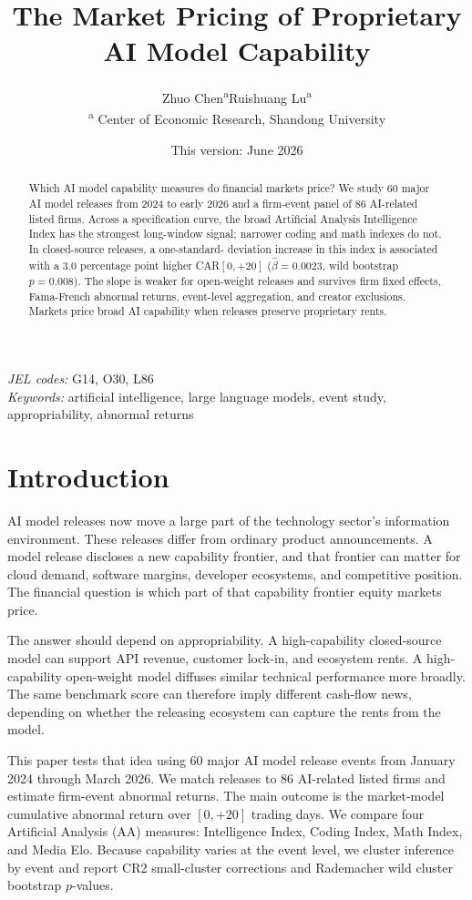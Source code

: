 \documentclass[12pt]{article}
\title{\textbf{The Market Pricing of Proprietary AI Model Capability}}
\author{\begin{tabular}{c}
Zhuo Chen\textsuperscript{a}\quad Ruishuang Lu\textsuperscript{a}\\[0.5em]
{\footnotesize \textsuperscript{a} Center of Economic Research, Shandong University}
\end{tabular}}
\date{\small This version: June 2026}
\begin{document}
\maketitle
\thispagestyle{empty}

\begin{abstract}
\noindent
Which AI model capability measures do financial markets price? We study 60 major
AI model releases from 2024 to early 2026 and a firm-event panel of 86
AI-related listed firms. Across a specification curve, the broad Artificial
Analysis Intelligence Index has the strongest long-window signal; narrower
coding and math indexes do not. In closed-source releases, a one-standard-
deviation increase in this index is associated with a 3.0 percentage point
higher CAR$[0,{+}20]$ ($\hat{\beta}=0.0023$, wild bootstrap $p=0.008$). The
slope is weaker for open-weight releases and survives firm fixed effects,
Fama-French abnormal returns, event-level aggregation, and creator exclusions.
Markets price broad AI capability when releases preserve proprietary rents.
\end{abstract}

\medskip
\noindent\textit{JEL codes:} G14, O30, L86\\
\noindent\textit{Keywords:} artificial intelligence, large language models, event study, appropriability, abnormal returns

\newpage

\section{Introduction}
\label{sec:intro}

AI model releases now move a large part of the technology sector's information
environment. These releases differ from ordinary product announcements. A model
release discloses a new capability frontier, and that frontier can matter for
cloud demand, software margins, developer ecosystems, and competitive position.
The financial question is which part of that capability frontier equity markets
price.

The answer should depend on appropriability. A high-capability closed-source
model can support API revenue, customer lock-in, and ecosystem rents. A high-
capability open-weight model diffuses similar technical performance more broadly.
The same benchmark score can therefore imply different cash-flow news, depending
on whether the releasing ecosystem can capture the rents from the model.

This paper tests that idea using 60 major AI model release events from January
2024 through March 2026. We match releases to 86 AI-related listed firms and
estimate firm-event abnormal returns. The main outcome is the market-model
cumulative abnormal return over $[0,{+}20]$ trading days. We compare four
Artificial Analysis (AA) measures: Intelligence Index, Coding Index, Math Index,
and Media Elo. Because capability varies at the event level, we cluster
inference by event and report CR2 small-cluster corrections and Rademacher wild
cluster bootstrap $p$-values.
\end{document}
